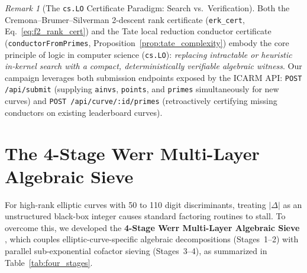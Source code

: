 \documentclass[10pt,a4paper]{article}
\theoremstyle{plain}
\theoremstyle{definition}
\theoremstyle{remark}
\newtheorem{remark}[theorem]{Remark}
\begin{document}
\begin{remark}[The \texttt{cs.LO} Certificate Paradigm: Search vs.\ Verification]
Both the Cremona--Brumer--Silverman 2-descent rank certificate (\texttt{erk\_cert}, Eq.~\eqref{eq:f2_rank_cert}) and the Tate local reduction conductor certificate (\texttt{conductorFromPrimes}, Proposition~\ref{prop:tate_complexity}) embody the core principle of logic in computer science (\texttt{cs.LO}): \emph{replacing intractable or heuristic in-kernel search with a compact, deterministically verifiable algebraic witness}. Our campaign leverages both submission endpoints exposed by the ICARM API: \texttt{POST /api/submit} (supplying \texttt{ainvs}, \texttt{points}, and \texttt{primes} simultaneously for new curves) and \texttt{POST /api/curve/:id/primes} (retroactively certifying missing conductors on existing leaderboard curves).
\end{remark}

\section{The 4-Stage Werr Multi-Layer Algebraic Sieve}\label{sec:werr_sieve}

For high-rank elliptic curves with 50 to 110 digit discriminants, treating $|\Delta|$ as an unstructured black-box integer causes standard factoring routines to stall. To overcome this, we developed the \textbf{4-Stage Werr Multi-Layer Algebraic Sieve} \cite{dagli2026zenodo,dagli2026sieve}, which couples elliptic-curve-specific algebraic decompositions (Stages~1--2) with parallel sub-exponential cofactor sieving (Stages~3--4), as summarized in Table~\ref{tab:four_stages}.
\end{document}
